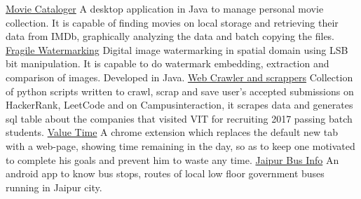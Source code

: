 \vspace{-2.6mm}
\begin{cvprojectentries}
\vspace{-1mm}
  \cvprojectentry
    {\href{https://github.com/googleknight/MovieCataloger}{Movie Cataloger}}
    {\small A desktop application in Java to manage personal movie collection. It is capable of finding movies on local storage and retrieving their data from IMDb, graphically analyzing the data and batch copying the files.
    }
    \newline
  \cvprojectentry    
    {\href{https://github.com/googleknight/FragileWatermarking}{Fragile Watermarking}}
    {\small Digital image watermarking in spatial domain using LSB bit manipulation. It is capable to do watermark embedding, extraction and comparison of images. Developed in Java.
    }
    \newline
  \cvprojectentry    
    {\href{https://github.com/googleknight/PythonScripts}{Web Crawler and scrappers}}
    {\small Collection of python scripts written to crawl, scrap and save user's accepted submissions on HackerRank, LeetCode and on Campusinteraction, it scrapes data and generates sql table about the companies that visited VIT for recruiting 2017 passing batch students.
    }
    \newline
  \cvprojectentry    
    {\href{https://github.com/googleknight/Value-Time}{Value Time}}
    {\small A chrome extension which replaces the default new tab with a web-page, showing time remaining in the day, so as to keep one motivated to complete his goals and prevent him to waste any time.
    }
    \newline
  \cvprojectentry    
    {\href{https://github.com/googleknight/jaipur-bus-app}{Jaipur Bus Info}}
    {\small An android app to know bus stops, routes of local low floor government buses running in Jaipur city.
    }    
\end{cvprojectentries}

